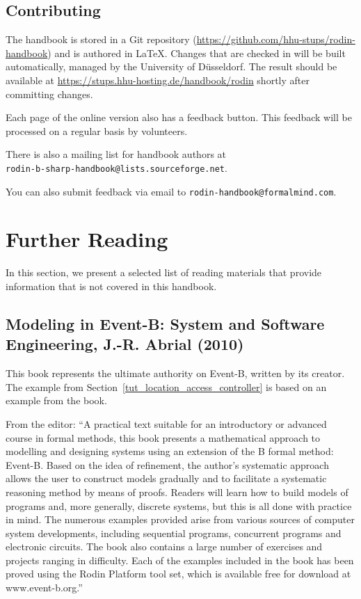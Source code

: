 \documentclass[twoside,10pt]{book}
\begin{document}
\subsection{Contributing}
\label{feedback}

The handbook is stored in a Git repository (\url{https://github.com/hhu-stups/rodin-handbook}) and is authored in \LaTeX.  Changes that are checked in will be built automatically, managed by the University of Düsseldorf.  The result should be available at \url{https://stups.hhu-hosting.de/handbook/rodin} shortly after committing changes.

Each page of the online version also has a feedback button.  This feedback will be processed on a regular basis by volunteers.

There is also a mailing list for handbook authors at 
\ifinprint \\ \fi
\texttt{rodin-b-sharp-handbook@lists.\-sourceforge.net}.

You can also submit feedback via email to \texttt{rodin-hand\-book@formal\-mind.com}.

\section{Further Reading}
\label{literature}

In this section, we present a selected list of reading materials that provide information that is not covered in this handbook.

\subsection{Modeling in Event-B: System and Software Engineering, J.-R. Abrial (2010)}
\label{abrial_2010}

This book represents the ultimate authority on Event-B, written by its creator.  The example from Section~\ref{tut_location_access_controller} is based on an example from the book.

From the editor: ``A practical text suitable for an introductory or advanced course in formal methods, this book presents a mathematical approach to modelling and designing systems using an extension of the B formal method: Event-B. Based on the idea of refinement, the author's systematic approach allows the user to construct models gradually and to facilitate a systematic reasoning method by means of proofs. Readers will learn how to build models of programs and, more generally, discrete systems, but this is all done with practice in mind. The numerous examples provided arise from various sources of computer system developments, including sequential programs, concurrent programs and electronic circuits. The book also contains a large number of exercises and projects ranging in difficulty. Each of the examples included in the book has been proved using the Rodin Platform tool set, which is available free for download at www.event-b.org.''
\end{document}
